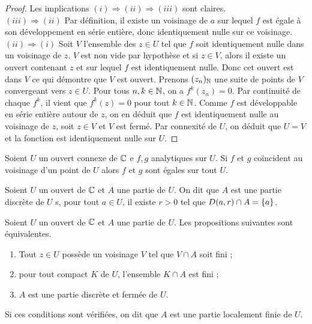 \begin{proof}
Les implications $(i) \Rightarrow (ii) \Rightarrow (iii)$ sont claires. \\

$(iii) \Rightarrow (ii)$ Par définition, il existe un voisinage de $a$ sur lequel $f$ est égale à son développement en série entière,
donc identiquement nulle sur ce voisinage. \\

$(ii) \Rightarrow (i)$ Soit $V$ l'ensemble des $z \in U$ tel que $f$ soit identiquement nulle dans un voisinage de $z$.
$V$ est non vide par hypothèse et si $z \in V$, alors il existe un ouvert contenant $z$ et sur lequel $f$ est identiquement nulle.
Donc cet ouvert est dans $V$ ce qui démontre que $V$ est ouvert.
Prenons $(z_n)_{\mathbb{N}}$ une suite de points de $V$ convergeant vers $z \in U$. 
Pour tous $n,k \in \mathbb{N}$, on a $f^{k}(z_n)=0$. Par continuité de chaque $f^{k}$, il vient que $f^{k}(z)=0$ pour tout $k \in \mathbb{N}$.
Comme $f$ est développable en série entière autour de $z$, on en déduit que $f$ est identiquement nulle au voisinage de $z$, soit 
$z \in V$ et $V$ est fermé. Par connexité de $U$, on déduit que $U=V$ et la fonction est identiquement nulle sur $U$.
\end{proof}

\begin{coro}
Soient $U$ un ouvert connexe de $\mathbb{C}$ e $f, g$ analytiques sur $U$. 
Si $f$ et $g$ coïncident au voisinage d'un point de $U$ alors $f$ et $g$ sont égales sur tout $U$.
\end{coro}

\begin{defn}
Soient $U$ un ouvert de $\mathbb{C}$ et $A$ une partie de $U$. On dit que $A$ est une partie discrète de $U$ s, pour tout $a \in U$, 
il existe $r>0$ tel que $D(a,r) \cap A = \{ a \}$.
\end{defn}

\begin{thm}
\label{thm:2}
Soient $U$ un ouvert de $\mathbb{C}$ et $A$ une partie de $U$. Les propositions suivantes sont équivalentes.
\begin{enumerate}[label=(\roman*)]
\item Tout $z \in U$ possède un voisinage $V$ tel que $V \cap A$ soit fini ;
\item pour tout compact $K$ de $U$, l'ensemble $K \cap A$ est fini ;
\item $A$ est une partie discrète et fermée de $U$.
\end{enumerate}
Si ces conditions sont vérifiées, on dit que $A$ est une partie localement finie de $U$.
\end{thm}


